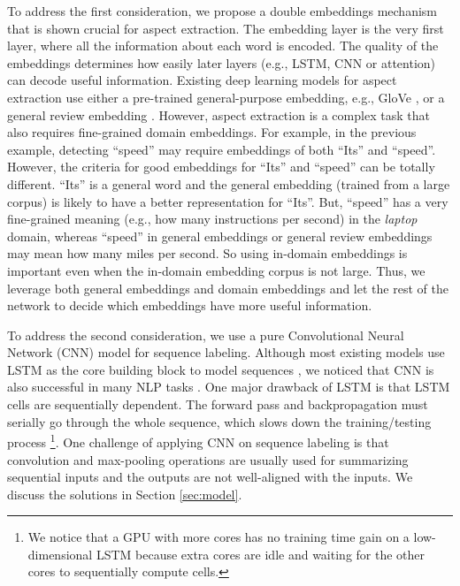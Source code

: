 \documentclass[11pt,a4paper]{article}
\begin{document}
To address the first consideration, we propose a double embeddings mechanism that is shown crucial for aspect extraction.
The embedding layer is the very first layer, where all the information about each word is encoded.
The quality of the embeddings determines how easily later layers (e.g., LSTM, CNN or attention) can decode useful information.
Existing deep learning models for aspect extraction use either a pre-trained general-purpose embedding, e.g., GloVe \cite{pennington2014glove}, or a general review embedding \cite{poria2016aspect}.
However, aspect extraction is a complex task that also requires fine-grained domain embeddings.
For example, in the previous example, detecting ``speed'' may require embeddings of both ``Its'' and ``speed''.
However, the criteria for good embeddings for ``Its'' and ``speed'' can be totally different.
``Its'' is a general word and the general embedding (trained from a large corpus) is likely to have a better representation for ``Its''.
But, ``speed'' has a very fine-grained meaning (e.g., how many instructions per second) in the \textit{laptop} domain, whereas ``speed'' in general embeddings or general review embeddings may mean how many miles per second.
So using in-domain embeddings is important even when the in-domain embedding corpus is not large. 
Thus, we leverage both general embeddings and domain embeddings and let the rest of the network to decide which embeddings have more useful information.

To address the second consideration, we use a pure Convolutional Neural Network (CNN) \cite{lecun1995convolutional} model for sequence labeling.
Although most existing models use LSTM \cite{hochreiter1997long} as the core building block to model sequences \cite{liu2015fine,li2017deep}, we noticed that CNN is also successful in many NLP tasks \cite{kim2014convolutional,zhang2015character,gehring2017convolutional}.
One major drawback of LSTM is that LSTM cells are sequentially dependent.
The forward pass and backpropagation must serially go through the whole sequence, which slows down the training/testing process
\footnote{We notice that a GPU with more cores has no training time gain on a low-dimensional LSTM because extra cores are idle and waiting for the other cores to sequentially compute cells.}.
One challenge of applying CNN on sequence labeling is that convolution and max-pooling operations are usually used for summarizing sequential inputs and the outputs are not well-aligned with the inputs. We discuss the solutions in Section \ref{sec:model}.
\end{document}
